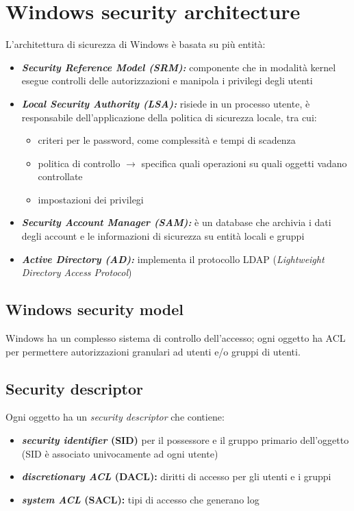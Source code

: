 \section{Windows security architecture}
L'architettura di sicurezza di Windows è basata su più entità:
\begin{itemize}
    \item \textbf{\textit{Security Reference Model (SRM):}} componente che in modalità kernel esegue 
    controlli delle autorizzazioni e manipola i privilegi degli utenti
    \item \textbf{\textit{Local Security Authority (LSA):}} risiede in un processo utente, è responsabile 
    dell'applicazione della politica di sicurezza locale, tra cui:
    \begin{itemize}
        \item criteri per le password, come complessità e tempi di scadenza 
        \item politica di controllo $\rightarrow$ specifica quali operazioni su quali oggetti vadano controllate 
        \item impostazioni dei privilegi
    \end{itemize}
    \item \textbf{\textit{Security Account Manager (SAM):}} è un database che archivia i dati degli account e le 
    informazioni di sicurezza su entità locali e gruppi
    \item \textbf{\textit{Active Directory (AD):}} implementa il protocollo LDAP (\textit{Lightweight Directory Access Protocol})
\end{itemize}

\subsection{Windows security model}
Windows ha un complesso sistema di controllo dell'accesso; ogni oggetto ha ACL per permettere autorizzazioni 
granulari ad utenti e/o gruppi di utenti.

\subsection{Security descriptor}
Ogni oggetto ha un \textit{security descriptor} che contiene:
\begin{itemize}
    \item \textbf{\textit{security identifier} (SID)} per il possessore e il gruppo primario dell'oggetto (SID è 
    associato univocamente ad ogni utente) 
    \item \textbf{\textit{discretionary ACL} (DACL):} diritti di accesso per gli utenti e i gruppi
    \item \textbf{\textit{system ACL} (SACL):} tipi di accesso che generano log
\end{itemize}

